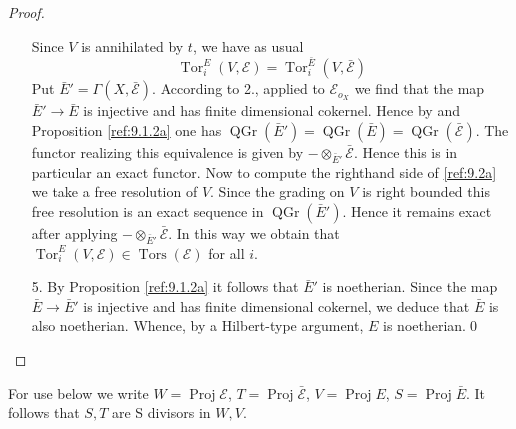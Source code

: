 \documentclass{amsproc}
\def\Escr{{\mathcal E}}
\def\Tors{\operatorname{Tors}}
\def\Tor{\operatorname {Tor}}
\def\Proj{\operatorname {Proj}}
\def\Tors{\operatorname {Tors}}
\def\r{\rightarrow}
\DeclareMathOperator{\QGr}{QGr}
\theoremstyle{definition}
\theoremstyle{remark}
\numberwithin{equation}{section}
\numberwithin{table}{section}
\numberwithin{figure}{section}
\begin{document}
\begin{proof}
\begin{itemize}
Since $V$ is annihilated by $t$, we have as usual
\begin{equation}
\label{ref:9.2a}
\Tor_i^E(V,\Escr)=\Tor_i^{\bar{E}}(V,\bar{\Escr})
\end{equation}
Put $\bar{E}'=\Gamma(X,\bar{\Escr})$. According to 2., applied to
$\Escr_{o_X}$ we find that the map $\bar{E}'\r \bar{E}$ is injective
and has finite dimensional cokernel.  Hence by \cite[Prop. 2.5]{AZ} and
Proposition \ref{ref:9.1.2a} one has
$\QGr(\bar{E}')=\QGr(\bar{E})=\QGr(\bar{\Escr})$.  The functor
realizing this equivalence is given by $-\otimes_{\bar{E}'}
\bar{\Escr}$. Hence this is in particular an exact functor. Now to
compute the righthand side of \eqref{ref:9.2a} we take a free resolution of
$V$. Since the grading on $V$ is right bounded this free resolution is
an exact sequence in $\QGr(\bar{E}')$. Hence it remains exact after
applying $-\otimes_{\bar{E}'} \bar{\Escr}$. In this way we obtain that
$\Tor_i^E(V,\Escr)\in \Tors(\Escr)$ for all $i$.
\item[5.]  By Proposition \ref{ref:9.1.2a} it follows that
  $\bar{E}'$ is noetherian. Since the map $\bar{E}\r \bar{E}'$ is
  injective and has finite dimensional cokernel, we deduce that
  $\bar{E}$ is also noetherian. Whence, by a Hilbert-type argument,
  $E$ is noetherian.\qed
\end{itemize}
\def\qed{}\end{proof}
For use below we write $W=\Proj \Escr$, $T=\Proj \bar{\Escr}$,
$V=\Proj E$, $S=\Proj \bar{E}$. It follows that $S,T$ are S
divisors in $W,V$.
\end{document}
